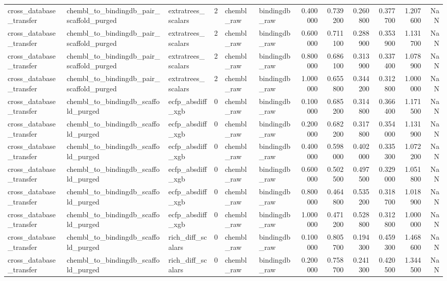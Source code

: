 \begin{longtable}{lllrllrrrrrr}
cross\_database\_transfer & chembl\_to\_bindingdb\_pair\_scaffold\_purged & extratrees\_scalars & 2 & chembl\_raw & bindingdb\_raw & 0.400000 & 0.739200 & 0.260800 & 0.377700 & 1.207600 & NaN \\
cross\_database\_transfer & chembl\_to\_bindingdb\_pair\_scaffold\_purged & extratrees\_scalars & 2 & chembl\_raw & bindingdb\_raw & 0.600000 & 0.711100 & 0.288900 & 0.353900 & 1.131700 & NaN \\
cross\_database\_transfer & chembl\_to\_bindingdb\_pair\_scaffold\_purged & extratrees\_scalars & 2 & chembl\_raw & bindingdb\_raw & 0.800000 & 0.686100 & 0.313900 & 0.337400 & 1.078900 & NaN \\
cross\_database\_transfer & chembl\_to\_bindingdb\_pair\_scaffold\_purged & extratrees\_scalars & 2 & chembl\_raw & bindingdb\_raw & 1.000000 & 0.655800 & 0.344200 & 0.312800 & 1.000000 & NaN \\
cross\_database\_transfer & chembl\_to\_bindingdb\_scaffold\_purged & ecfp\_absdiff\_xgb & 0 & chembl\_raw & bindingdb\_raw & 0.100000 & 0.685200 & 0.314800 & 0.366400 & 1.171500 & NaN \\
cross\_database\_transfer & chembl\_to\_bindingdb\_scaffold\_purged & ecfp\_absdiff\_xgb & 0 & chembl\_raw & bindingdb\_raw & 0.200000 & 0.682200 & 0.317800 & 0.354000 & 1.131900 & NaN \\
cross\_database\_transfer & chembl\_to\_bindingdb\_scaffold\_purged & ecfp\_absdiff\_xgb & 0 & chembl\_raw & bindingdb\_raw & 0.400000 & 0.598000 & 0.402000 & 0.335300 & 1.072200 & NaN \\
cross\_database\_transfer & chembl\_to\_bindingdb\_scaffold\_purged & ecfp\_absdiff\_xgb & 0 & chembl\_raw & bindingdb\_raw & 0.600000 & 0.502500 & 0.497500 & 0.329000 & 1.051800 & NaN \\
cross\_database\_transfer & chembl\_to\_bindingdb\_scaffold\_purged & ecfp\_absdiff\_xgb & 0 & chembl\_raw & bindingdb\_raw & 0.800000 & 0.464800 & 0.535200 & 0.318700 & 1.018900 & NaN \\
cross\_database\_transfer & chembl\_to\_bindingdb\_scaffold\_purged & ecfp\_absdiff\_xgb & 0 & chembl\_raw & bindingdb\_raw & 1.000000 & 0.471200 & 0.528800 & 0.312800 & 1.000000 & NaN \\
cross\_database\_transfer & chembl\_to\_bindingdb\_scaffold\_purged & rich\_diff\_scalars & 0 & chembl\_raw & bindingdb\_raw & 0.100000 & 0.805700 & 0.194300 & 0.459300 & 1.468600 & NaN \\
cross\_database\_transfer & chembl\_to\_bindingdb\_scaffold\_purged & rich\_diff\_scalars & 0 & chembl\_raw & bindingdb\_raw & 0.200000 & 0.758700 & 0.241300 & 0.420500 & 1.344500 & NaN \\

\end{longtable}
